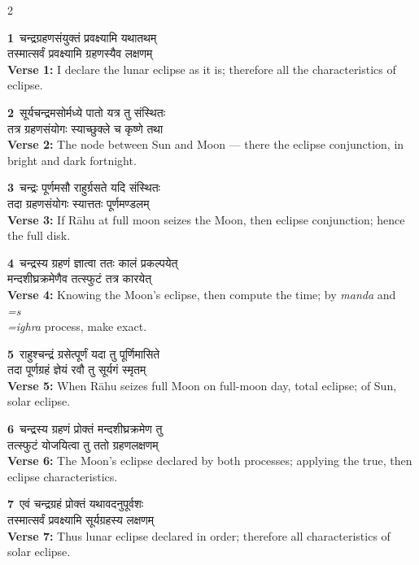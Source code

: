 \documentclass[11pt,a4paper]{article}
\newcommand{\dev}[1]{{\devanagarifont #1}}
\newcommand{\iast}[1]{\textit{#1}}
\newcommand{\vnum}[1]{\textcolor{versenumbercolor}{\textbf{#1}}}
\begin{document}
\begin{paracol}{2}

\switchcolumn[0]
\vnum{1}\ \dev{चन्द्रग्रहणसंयुक्तं प्रवक्ष्यामि यथातथम्}\\
\dev{तस्मात्सर्वं प्रवक्ष्यामि ग्रहणस्यैव लक्षणम्}\\
\switchcolumn[1]
\textbf{Verse 1:} I declare the lunar eclipse as it is; therefore all the characteristics of eclipse.

\switchcolumn[0]
\vnum{2}\ \dev{सूर्यचन्द्रमसोर्मध्ये पातो यत्र तु संस्थितः}\\
\dev{तत्र ग्रहणसंयोगः स्याच्छुक्ले च कृष्णे तथा}\\
\switchcolumn[1]
\textbf{Verse 2:} The node between Sun and Moon --- there the eclipse conjunction, in bright and dark fortnight.

\switchcolumn[0]
\vnum{3}\ \dev{चन्द्रः पूर्णमसौ राहुर्ग्रसते यदि संस्थितः}\\
\dev{तदा ग्रहणसंयोगः स्यात्ततः पूर्णमण्डलम्}\\
\switchcolumn[1]
\textbf{Verse 3:} If R\=ahu at full moon seizes the Moon, then eclipse conjunction; hence the full disk.

\switchcolumn[0]
\vnum{4}\ \dev{चन्द्रस्य ग्रहणं ज्ञात्वा ततः कालं प्रकल्पयेत्}\\
\dev{मन्दशीघ्रक्रमेणैव तत्स्फुटं तत्र कारयेत्}\\
\switchcolumn[1]
\textbf{Verse 4:} Knowing the Moon's eclipse, then compute the time; by \iast{manda} and \iast{\\=s\\=ighra} process, make exact.

\switchcolumn[0]
\vnum{5}\ \dev{राहुश्चन्द्रं ग्रसेत्पूर्णं यदा तु पूर्णिमासिते}\\
\dev{तदा पूर्णग्रहं ज्ञेयं रवौ तु सूर्यगं स्मृतम्}\\
\switchcolumn[1]
\textbf{Verse 5:} When R\=ahu seizes full Moon on full-moon day, total eclipse; of Sun, solar eclipse.

\switchcolumn[0]
\vnum{6}\ \dev{चन्द्रस्य ग्रहणं प्रोक्तं मन्दशीघ्रक्रमेण तु}\\
\dev{तत्स्फुटं योजयित्वा तु ततो ग्रहणलक्षणम्}\\
\switchcolumn[1]
\textbf{Verse 6:} The Moon's eclipse declared by both processes; applying the true, then eclipse characteristics.

\switchcolumn[0]
\vnum{7}\ \dev{एवं चन्द्रग्रहं प्रोक्तं यथावदनुपूर्वशः}\\
\dev{तस्मात्सर्वं प्रवक्ष्यामि सूर्यग्रहस्य लक्षणम्}\\
\switchcolumn[1]
\textbf{Verse 7:} Thus lunar eclipse declared in order; therefore all characteristics of solar eclipse.

\end{paracol}
\clearpage
\end{document}
